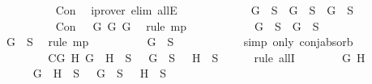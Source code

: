 \begin{isabellebody}
\ \ \ \ \ \ \ \ \ \ \isamarkupfalse%
\ Con\ \isamarkupfalse%
\ {\isacharparenleft}iprover\ elim{\isacharcolon}\ allE{\isacharparenright}\isanewline
\ \ \ \ \ \ \ \ \isamarkupfalse%
\ \isamarkupfalse%
\ {\isachardoublequoteopen}{\isacharparenleft}\isactrlbold {\isasymnot}{\isacharparenleft}\isactrlbold {\isasymnot}\ G{\isacharparenright}{\isacharparenright}\ {\isasymin}\ S\ {\isasymlongrightarrow}\ G\ {\isasymin}\ S\ {\isasymand}\ G\ {\isasymin}\ S{\isachardoublequoteclose}\isanewline
\ \ \ \ \ \ \ \ \ \ \isamarkupfalse%
\ {\isacartoucheopen}Con\ {\isacharparenleft}\isactrlbold {\isasymnot}\ {\isacharparenleft}\isactrlbold {\isasymnot}\ G{\isacharparenright}{\isacharparenright}\ G\ G{\isacartoucheclose}\ \isamarkupfalse%
\ {\isacharparenleft}rule\ mp{\isacharparenright}\isanewline
\ \ \ \ \ \ \ \ \isamarkupfalse%
\ \isamarkupfalse%
\ {\isachardoublequoteopen}G\ {\isasymin}\ S\ {\isasymand}\ G\ {\isasymin}\ S{\isachardoublequoteclose}\isanewline
\ \ \ \ \ \ \ \ \ \ \isamarkupfalse%
\ {\isacartoucheopen}\isactrlbold {\isasymnot}\ {\isacharparenleft}\isactrlbold {\isasymnot}\ G{\isacharparenright}\ {\isasymin}\ S{\isacartoucheclose}\ \isamarkupfalse%
\ {\isacharparenleft}rule\ mp{\isacharparenright}\isanewline
\ \ \ \ \ \ \ \ \isamarkupfalse%
\ {\isachardoublequoteopen}G\ {\isasymin}\ S{\isachardoublequoteclose}\isanewline
\ \ \ \ \ \ \ \ \ \ \isamarkupfalse%
\ {\isacharparenleft}simp\ only{\isacharcolon}\ conj{\isacharunderscore}absorb{\isacharparenright}\isanewline
\ \ \ \ \ \ \isamarkupfalse%
\isanewline
\ \ \ \ \isamarkupfalse%
\isanewline
\ \ \ \ \isamarkupfalse%
\ C{}{\isacharcolon}{\isachardoublequoteopen}{\isasymforall}G\ H{\isachardot}\ \isactrlbold {\isasymnot}{\isacharparenleft}G\ \isactrlbold {\isasymand}\ H{\isacharparenright}\ {\isasymin}\ S\ {\isasymlongrightarrow}\ \isactrlbold {\isasymnot}\ G\ {\isasymin}\ S\ {\isasymor}\ \isactrlbold {\isasymnot}\ H\ {\isasymin}\ S{\isachardoublequoteclose}\isanewline
\ \ \ \ \isamarkupfalse%
\ {\isacharparenleft}rule\ allI{\isacharparenright}{\isacharplus}\isanewline
\ \ \ \ \ \ \isamarkupfalse%
\ G\ H\isanewline
\ \ \ \ \ \ \isamarkupfalse%
\ {\isachardoublequoteopen}\isactrlbold {\isasymnot}{\isacharparenleft}G\ \isactrlbold {\isasymand}\ H{\isacharparenright}\ {\isasymin}\ S\ {\isasymlongrightarrow}\ \isactrlbold {\isasymnot}\ G\ {\isasymin}\ S\ {\isasymor}\ \isactrlbold {\isasymnot}\ H\ {\isasymin}\ S{\isachardoublequoteclose}\isanewline

\end{isabellebody}
